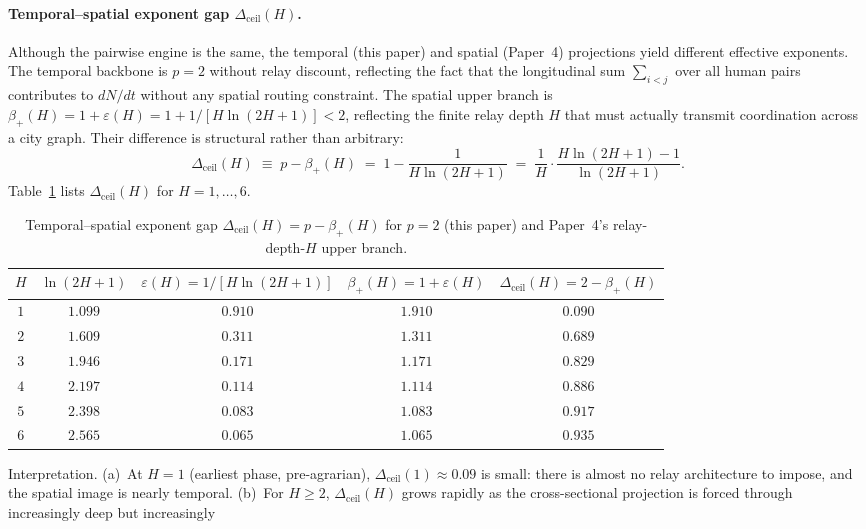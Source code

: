 \documentclass[11pt]{article}
\begin{document}
\paragraph{Temporal--spatial exponent gap $\Delta_{\mathrm{ceil}}(H)$.}
Although the pairwise engine is the same, the temporal (this paper) and
spatial (Paper~4) projections yield different effective exponents.
The temporal backbone is $p=2$ without relay discount, reflecting the fact
that the longitudinal sum $\sum_{i<j}$ over all human pairs contributes to
$dN/dt$ without any spatial routing constraint.  The spatial upper branch
is $\beta_+(H)=1+\varepsilon(H)=1+1/[H\ln(2H+1)]<2$, reflecting the finite
relay depth $H$ that must actually transmit coordination across a city
graph.  Their difference is structural rather than arbitrary:
\begin{equation}
\Delta_{\mathrm{ceil}}(H)\;\equiv\;p-\beta_+(H)\;=\;1-\frac{1}{H\ln(2H+1)}
\;=\;\frac{1}{H}\cdot\frac{H\ln(2H+1)-1}{\ln(2H+1)}.
\label{eq:S10_13_Delta_H}
\end{equation}
Table~\ref{tab:S10_13_Delta_H} lists $\Delta_{\mathrm{ceil}}(H)$ for $H=1,\ldots,6$.
\begin{table}[H]
\centering
\caption{Temporal--spatial exponent gap $\Delta_{\mathrm{ceil}}(H)=p-\beta_+(H)$
for $p=2$ (this paper) and Paper~4's relay-depth-$H$ upper branch.}
\label{tab:S10_13_Delta_H}
\begin{tabular}{ccccc}
\toprule
$H$ & $\ln(2H+1)$ & $\varepsilon(H)=1/[H\ln(2H+1)]$ & $\beta_+(H)=1+\varepsilon(H)$ & $\Delta_{\mathrm{ceil}}(H)=2-\beta_+(H)$ \\
\midrule
$1$ & $1.099$ & $0.910$ & $1.910$ & $0.090$ \\
$2$ & $1.609$ & $0.311$ & $1.311$ & $0.689$ \\
$3$ & $1.946$ & $0.171$ & $1.171$ & $0.829$ \\
$4$ & $2.197$ & $0.114$ & $1.114$ & $0.886$ \\
$5$ & $2.398$ & $0.083$ & $1.083$ & $0.917$ \\
$6$ & $2.565$ & $0.065$ & $1.065$ & $0.935$ \\
\bottomrule
\end{tabular}
\end{table}
Interpretation.
(a)~At $H=1$ (earliest phase, pre-agrarian), $\Delta_{\mathrm{ceil}}(1)\approx 0.09$ is small:
there is almost no relay architecture to impose, and the spatial image is
nearly temporal.  (b)~For $H\ge 2$, $\Delta_{\mathrm{ceil}}(H)$ grows rapidly as the
cross-sectional projection is forced through increasingly deep but increasingly
\end{document}
